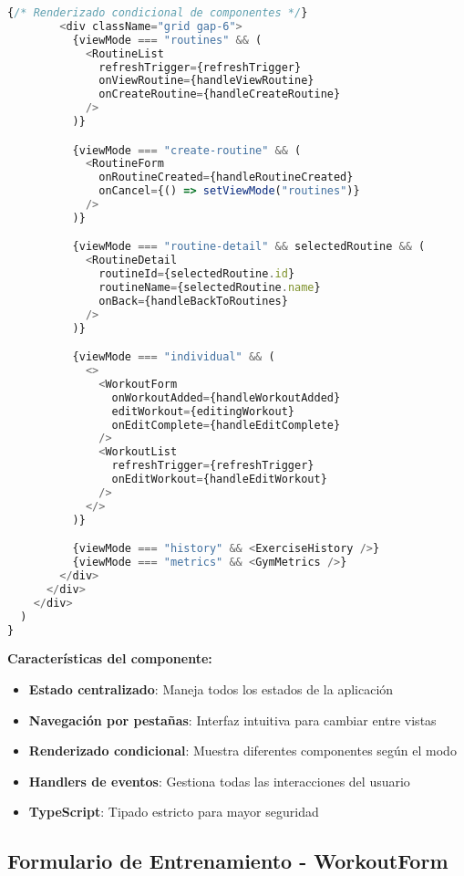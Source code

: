 \documentclass[12pt,a4paper]{article}
\begin{document}
\begin{lstlisting}[language=typescript, caption=app/gym/page.tsx - Estructura completa]
        {/* Renderizado condicional de componentes */}
        <div className="grid gap-6">
          {viewMode === "routines" && (
            <RoutineList
              refreshTrigger={refreshTrigger}
              onViewRoutine={handleViewRoutine}
              onCreateRoutine={handleCreateRoutine}
            />
          )}

          {viewMode === "create-routine" && (
            <RoutineForm 
              onRoutineCreated={handleRoutineCreated} 
              onCancel={() => setViewMode("routines")} 
            />
          )}

          {viewMode === "routine-detail" && selectedRoutine && (
            <RoutineDetail
              routineId={selectedRoutine.id}
              routineName={selectedRoutine.name}
              onBack={handleBackToRoutines}
            />
          )}

          {viewMode === "individual" && (
            <>
              <WorkoutForm
                onWorkoutAdded={handleWorkoutAdded}
                editWorkout={editingWorkout}
                onEditComplete={handleEditComplete}
              />
              <WorkoutList 
                refreshTrigger={refreshTrigger} 
                onEditWorkout={handleEditWorkout} 
              />
            </>
          )}

          {viewMode === "history" && <ExerciseHistory />}
          {viewMode === "metrics" && <GymMetrics />}
        </div>
      </div>
    </div>
  )
}
\end{lstlisting}

\textbf{Características del componente:}
\begin{itemize}
    \item \textbf{Estado centralizado}: Maneja todos los estados de la aplicación
    \item \textbf{Navegación por pestañas}: Interfaz intuitiva para cambiar entre vistas
    \item \textbf{Renderizado condicional}: Muestra diferentes componentes según el modo
    \item \textbf{Handlers de eventos}: Gestiona todas las interacciones del usuario
    \item \textbf{TypeScript}: Tipado estricto para mayor seguridad
\end{itemize}

\subsection{Formulario de Entrenamiento - WorkoutForm}
\end{document}
